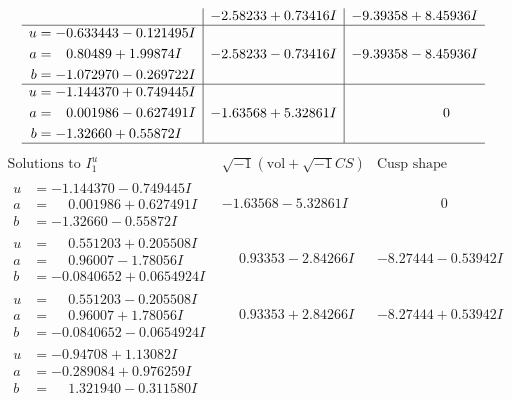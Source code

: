 \documentclass[1p]{elsarticle_modified}
\theoremstyle{definition}
\newcommand{\I}{\sqrt{-1}}
\begin{document}
$$\begin{array}{c|c|c}
 & -2.58233 + 0.73416 I & -9.39358 + 8.45936 I \\ \hline\begin{aligned}
u &= -0.633443 - 0.121495 I \\
a &= \phantom{-}0.80489 + 1.99874 I \\
b &= -1.072970 - 0.269722 I\end{aligned}
 & -2.58233 - 0.73416 I & -9.39358 - 8.45936 I \\ \hline\begin{aligned}
u &= -1.144370 + 0.749445 I \\
a &= \phantom{-}0.001986 - 0.627491 I \\
b &= -1.32660 + 0.55872 I\end{aligned}
 & -1.63568 + 5.32861 I & \phantom{-0.000000 } 0\\
 \hline 
 \end{array}$$\newpage$$\begin{array}{c|c|c}  
\text{Solutions to }I^u_{1}& \I (\text{vol} + \sqrt{-1}CS) & \text{Cusp shape}\\
 \hline 
\begin{aligned}
u &= -1.144370 - 0.749445 I \\
a &= \phantom{-}0.001986 + 0.627491 I \\
b &= -1.32660 - 0.55872 I\end{aligned}
 & -1.63568 - 5.32861 I & \phantom{-0.000000 } 0 \\ \hline\begin{aligned}
u &= \phantom{-}0.551203 + 0.205508 I \\
a &= \phantom{-}0.96007 - 1.78056 I \\
b &= -0.0840652 + 0.0654924 I\end{aligned}
 & \phantom{-}0.93353 - 2.84266 I & -8.27444 - 0.53942 I \\ \hline\begin{aligned}
u &= \phantom{-}0.551203 - 0.205508 I \\
a &= \phantom{-}0.96007 + 1.78056 I \\
b &= -0.0840652 - 0.0654924 I\end{aligned}
 & \phantom{-}0.93353 + 2.84266 I & -8.27444 + 0.53942 I \\ \hline\begin{aligned}
u &= -0.94708 + 1.13082 I \\
a &= -0.289084 + 0.976259 I \\
b &= \phantom{-}1.321940 - 0.311580 I\end{aligned}

\end{array}$$
\end{document}
